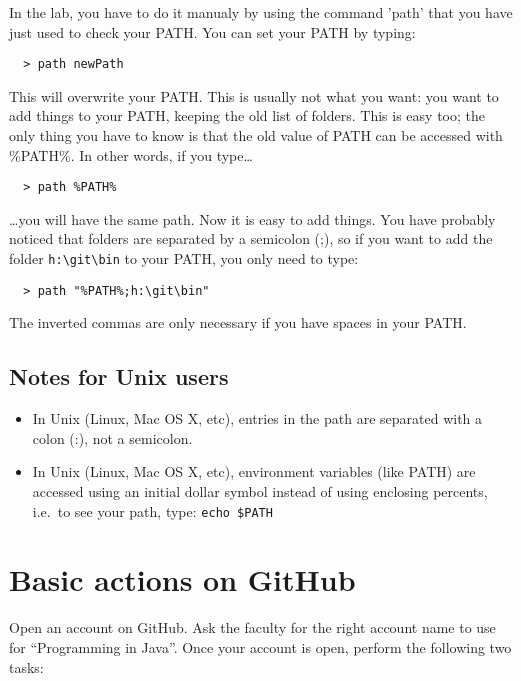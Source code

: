 \documentclass{article}
\begin{document}
In the lab, you have to do it manualy by using the command 'path' that
you have 
just used to check your PATH. You can set your PATH by typing:

\begin{verbatim}
  > path newPath
\end{verbatim}


This will overwrite your PATH. This is usually not what you want: you
want to add things to your PATH, keeping the old list of folders. This
is easy too; the only thing you have to know is that the old value of
PATH can be accessed with \%PATH\%. In other words, if you type\ldots

\begin{verbatim}
  > path %PATH%
\end{verbatim}

\ldots you will have the same path. Now it is easy to add things. You
have probably noticed that folders are separated by a semicolon (;),
so if you want to add the folder \verb+h:\git\bin+ to your PATH, you
only 
need to type:

\begin{verbatim}
  > path "%PATH%;h:\git\bin"
\end{verbatim}

The inverted commas are only necessary if you have spaces in your PATH.

\subsection*{Notes for Unix users}
\label{sec:notes-unix-users}

\begin{itemize}
\item In Unix (Linux, Mac OS X, etc), entries in the path are
  separated with a colon (:), not a semicolon.
\item In Unix (Linux, Mac OS X, etc), environment variables (like
  PATH) are accessed using an initial dollar symbol instead of using
  enclosing percents, i.e.~to see your path, type: \verb+echo $PATH+
\end{itemize}

\section{Basic actions on GitHub}
\label{sec:basic-steps-with}

Open an account on GitHub. Ask the faculty for the right account name
to use for ``Programming in Java''. Once your account is open, perform
the following two tasks: 
\end{document}
